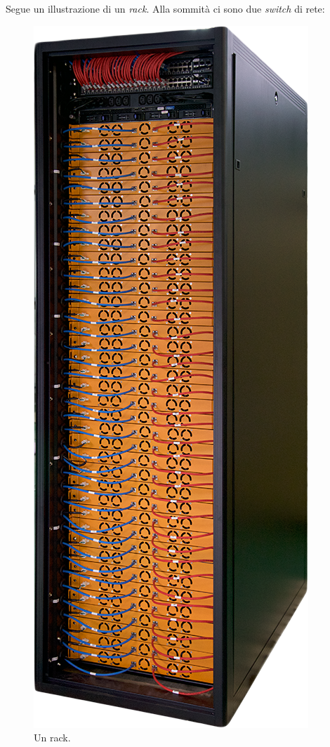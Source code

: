 Segue un illustrazione di un \textit{rack}. Alla sommit\`{a} ci sono due \textit{switch} di rete:

\begin{center}
\begin{figure}[htbp]
\includegraphics[scale=0.30]{img/rack.png}
\caption{Un rack. \label{fig:rack}}
\end{figure}
\end{center}
